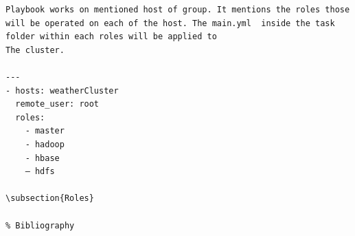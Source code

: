 \documentclass[9pt,twocolumn,twoside]{../../styles/osajnl}
\begin{document}
\begin{verbatim}
Playbook works on mentioned host of group. It mentions the roles those will be operated on each of the host. The main.yml  inside the task folder within each roles will be applied to 
The cluster. 

---
- hosts: weatherCluster 
  remote_user: root
  roles:
    - master
    - hadoop
    - hbase
    — hdfs

\subsection{Roles}

% Bibliography


 

\end{verbatim}
\end{document}
